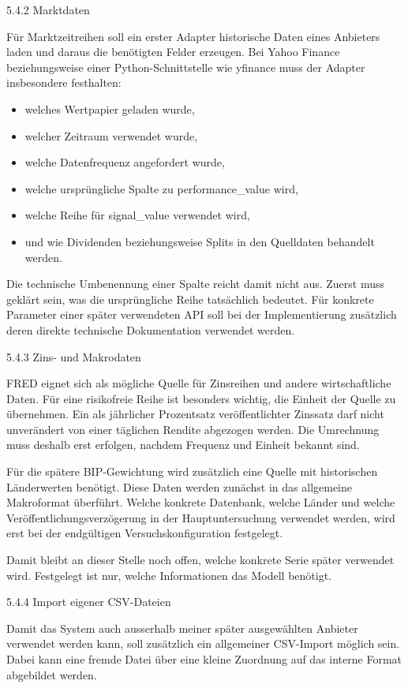 \documentclass[
  ngerman,
  a4paper,
  DIV=11,
  oneside]{scrreprt}
\providecommand{\tightlist}{%
  \setlength{\itemsep}{0pt}\setlength{\parskip}{0pt}}
\begin{document}
5.4.2 Marktdaten

Für Marktzeitreihen soll ein erster Adapter historische Daten eines
Anbieters laden und daraus die benötigten Felder erzeugen. Bei Yahoo
Finance beziehungsweise einer Python-Schnittstelle wie yfinance muss der
Adapter insbesondere festhalten:

\begin{itemize}
\tightlist
\item
  welches Wertpapier geladen wurde,
\item
  welcher Zeitraum verwendet wurde,
\item
  welche Datenfrequenz angefordert wurde,
\item
  welche ursprüngliche Spalte zu performance\_value wird,
\item
  welche Reihe für signal\_value verwendet wird,
\item
  und wie Dividenden beziehungsweise Splits in den Quelldaten behandelt
  werden.
\end{itemize}

Die technische Umbenennung einer Spalte reicht damit nicht aus. Zuerst
muss geklärt sein, was die ursprüngliche Reihe tatsächlich bedeutet. Für
konkrete Parameter einer später verwendeten API soll bei der
Implementierung zusätzlich deren direkte technische Dokumentation
verwendet werden.

5.4.3 Zins- und Makrodaten

FRED eignet sich als mögliche Quelle für Zinsreihen und andere
wirtschaftliche Daten. Für eine risikofreie Reihe ist besonders wichtig,
die Einheit der Quelle zu übernehmen. Ein als jährlicher Prozentsatz
veröffentlichter Zinssatz darf nicht unverändert von einer täglichen
Rendite abgezogen werden. Die Umrechnung muss deshalb erst erfolgen,
nachdem Frequenz und Einheit bekannt sind.

Für die spätere BIP-Gewichtung wird zusätzlich eine Quelle mit
historischen Länderwerten benötigt. Diese Daten werden zunächst in das
allgemeine Makroformat überführt. Welche konkrete Datenbank, welche
Länder und welche Veröffentlichungsverzögerung in der Hauptuntersuchung
verwendet werden, wird erst bei der endgültigen Versuchskonfiguration
festgelegt.

Damit bleibt an dieser Stelle noch offen, welche konkrete Serie später
verwendet wird. Festgelegt ist nur, welche Informationen das Modell
benötigt.

5.4.4 Import eigener CSV-Dateien

Damit das System auch ausserhalb meiner später ausgewählten Anbieter
verwendet werden kann, soll zusätzlich ein allgemeiner CSV-Import
möglich sein. Dabei kann eine fremde Datei über eine kleine Zuordnung
auf das interne Format abgebildet werden.
\end{document}

